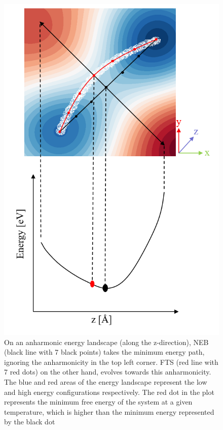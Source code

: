 \documentclass{article}
\begin{document}
\begin{figure}[htp]
\centering
\includegraphics{FTS_anharmonic}
\caption{On an anharmonic energy landscape (along the z-direction), NEB (black line with 7 black points) takes the minimum energy path, ignoring the anharmonicity in the top left corner. FTS (red line with 7 red dots) on the other hand, evolves towards this anharmonicity. The blue and red areas of the energy landscape represent the low and high energy configurations respectively. The red dot in the plot represents the minimum free energy of the system at a given temperature, which is higher than the minimum energy represented by the black dot}
\label{fig:5}
\end{figure}

\newpage
\end{document}
